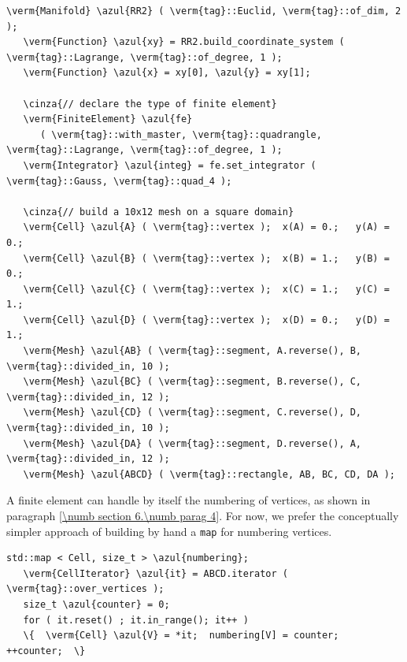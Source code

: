 \begin{Verbatim}[commandchars=\\\{\},formatcom=\small\tt,frame=single,
   label=parag-\ref{\numb section 6.\numb parag 2}.cpp,rulecolor=\color{coment},
   baselinestretch=0.94,framesep=2mm                                            ]
   \verm{Manifold} \azul{RR2} ( \verm{tag}::Euclid, \verm{tag}::of_dim, 2 );
   \verm{Function} \azul{xy} = RR2.build_coordinate_system ( \verm{tag}::Lagrange, \verm{tag}::of_degree, 1 );
   \verm{Function} \azul{x} = xy[0], \azul{y} = xy[1];

   \cinza{// declare the type of finite element}
   \verm{FiniteElement} \azul{fe}
      ( \verm{tag}::with_master, \verm{tag}::quadrangle, \verm{tag}::Lagrange, \verm{tag}::of_degree, 1 );
   \verm{Integrator} \azul{integ} = fe.set_integrator ( \verm{tag}::Gauss, \verm{tag}::quad_4 );

   \cinza{// build a 10x12 mesh on a square domain}
   \verm{Cell} \azul{A} ( \verm{tag}::vertex );  x(A) = 0.;   y(A) = 0.;
   \verm{Cell} \azul{B} ( \verm{tag}::vertex );  x(B) = 1.;   y(B) = 0.;
   \verm{Cell} \azul{C} ( \verm{tag}::vertex );  x(C) = 1.;   y(C) = 1.;
   \verm{Cell} \azul{D} ( \verm{tag}::vertex );  x(D) = 0.;   y(D) = 1.;
   \verm{Mesh} \azul{AB} ( \verm{tag}::segment, A.reverse(), B, \verm{tag}::divided_in, 10 );
   \verm{Mesh} \azul{BC} ( \verm{tag}::segment, B.reverse(), C, \verm{tag}::divided_in, 12 );
   \verm{Mesh} \azul{CD} ( \verm{tag}::segment, C.reverse(), D, \verm{tag}::divided_in, 10 );
   \verm{Mesh} \azul{DA} ( \verm{tag}::segment, D.reverse(), A, \verm{tag}::divided_in, 12 );
   \verm{Mesh} \azul{ABCD} ( \verm{tag}::rectangle, AB, BC, CD, DA );
\end{Verbatim}
\vskip 1mm

A finite element can handle by itself the numbering of vertices, as shown in paragraph
\ref{\numb section 6.\numb parag 4}.
For now, we prefer the conceptually simpler approach of building by hand a {\small\tt map}
for numbering vertices.
\vskip 1mm

\begin{Verbatim}[commandchars=\\\{\},formatcom=\small\tt,frame=single,
   label=parag-\ref{\numb section 6.\numb parag 2}.cpp,rulecolor=\color{coment},
   baselinestretch=0.94,framesep=2mm                                            ]
   std::map < Cell, size_t > \azul{numbering};
   \verm{CellIterator} \azul{it} = ABCD.iterator ( \verm{tag}::over_vertices );
   size_t \azul{counter} = 0;
   for ( it.reset() ; it.in_range(); it++ )
   \{  \verm{Cell} \azul{V} = *it;  numbering[V] = counter;  ++counter;  \}
\end{Verbatim}
\vskip 1mm

